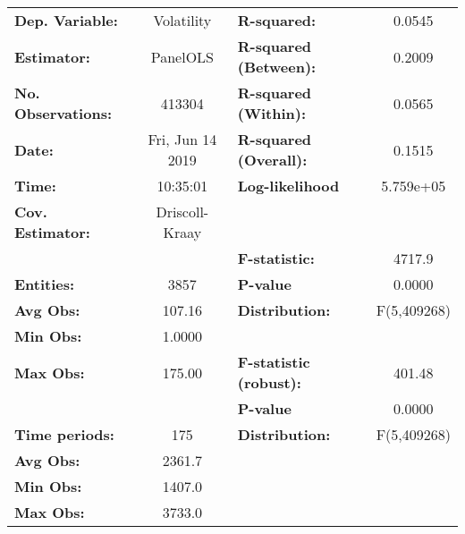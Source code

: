 \begin{center}
\begin{tabular}{lclc}
\toprule
\textbf{Dep. Variable:}                 &     Volatility     & \textbf{  R-squared:         }   &      0.0545      \\
\textbf{Estimator:}                     &      PanelOLS      & \textbf{  R-squared (Between):}  &      0.2009      \\
\textbf{No. Observations:}              &       413304       & \textbf{  R-squared (Within):}   &      0.0565      \\
\textbf{Date:}                          &  Fri, Jun 14 2019  & \textbf{  R-squared (Overall):}  &      0.1515      \\
\textbf{Time:}                          &      10:35:01      & \textbf{  Log-likelihood     }   &    5.759e+05     \\
\textbf{Cov. Estimator:}                &   Driscoll-Kraay   & \textbf{                     }   &                  \\
\textbf{}                               &                    & \textbf{  F-statistic:       }   &      4717.9      \\
\textbf{Entities:}                      &        3857        & \textbf{  P-value            }   &      0.0000      \\
\textbf{Avg Obs:}                       &       107.16       & \textbf{  Distribution:      }   &   F(5,409268)    \\
\textbf{Min Obs:}                       &       1.0000       & \textbf{                     }   &                  \\
\textbf{Max Obs:}                       &       175.00       & \textbf{  F-statistic (robust):} &      401.48      \\
\textbf{}                               &                    & \textbf{  P-value            }   &      0.0000      \\
\textbf{Time periods:}                  &        175         & \textbf{  Distribution:      }   &   F(5,409268)    \\
\textbf{Avg Obs:}                       &       2361.7       & \textbf{                     }   &                  \\
\textbf{Min Obs:}                       &       1407.0       & \textbf{                     }   &                  \\
\textbf{Max Obs:}                       &       3733.0       & \textbf{                     }   &                  \\

\end{tabular}
\end{center}
